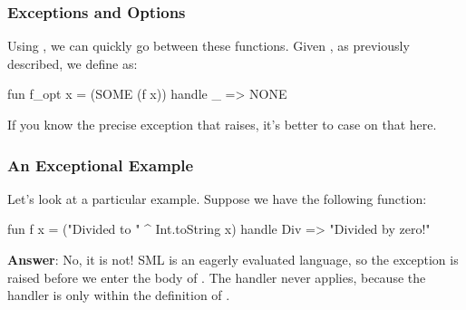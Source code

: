 \documentclass[aspectratio=169]{beamer}
\begin{document}
\begin{frame}[fragile]
  \frametitle{Exceptions and Options}

  Using , we can quickly go between these functions. Given
  , as previously described, we define  as:
  \begin{codeblock}
    fun f_opt x = (SOME (f x)) handle _ => NONE
  \end{codeblock}

  \pause
  \vspace{\fill}


  \pause
  \vspace{\fill}


  \pause
  \vspace{\fill}

  If you know the precise exception that  raises, it's better to case on
  that here.
\end{frame}

\begin{frame}[fragile]
  \frametitle{An Exceptional Example}

  Let's look at a particular example. Suppose we have the following function:

  \pause
  \vspace{\fill}

  \begin{codeblock}
    fun f x =
      ("Divided to " ^ Int.toString x)
      handle Div => "Divided by zero!"
  \end{codeblock}

  \pause
  \vspace{\fill}


  \pause
  \vspace{\fill}

  \textbf{Answer}: No, it is not! SML is an eagerly evaluated language, so the exception 
  is raised before we enter the body of . The handler never applies, because the handler is
  only within the definition of .
\end{frame}
\end{document}
